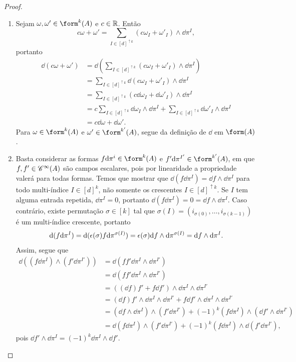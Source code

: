 \begin{proof}
	\begin{enumerate}
	\item Sejam $\omega,\omega' \in \form^k (A)$ e $c \in \mathbb{R}$. Então
	\begin{equation*}
	c\omega + \omega' = \sum_{I \in [d]^{\uparrow k}} (c\omega_I + \omega'_I) \wedge \dd\pi^I,
	\end{equation*}	
portanto
		\begin{align*}
		\dd (c\omega + \omega') &= \dd \left( \sum_{I \in [d]^{\uparrow k}} (c\omega_I + \omega'_I) \wedge \dd\pi^I \right) \\
			&= \sum_{I \in [d]^{\uparrow k}} \dd(c\omega_I + \omega'_I) \wedge \dd\pi^I \\
			&= \sum_{I \in [d]^{\uparrow k}} (c\dd\omega_I + \dd\omega'_I) \wedge \dd\pi^I \\
			&= c\sum_{I \in [d]^{\uparrow k}} \dd\omega_I \wedge \dd\pi^I + \sum_{I \in [d]^{\uparrow k}} \dd\omega'_I \wedge \dd\pi^I \\
			&= c\dd\omega + \dd\omega'.
		\end{align*}
Para $\omega \in \form^k (A)$ e $\omega' \in \form^{k'} (A)$, segue da definição de $\dd$ em $\form (A)$.
	
	\item Basta considerar as formas $f \dd\pi^i \in \form^k (A)$ e $f' \dd\pi^{I'} \in \form^{k'} (A)$, em que $f,f' \in \mathscr{C}^\infty(A)$ são campos escalares, pois por linearidade a propriedade valerá para todas formas. Temos que mostrar que $\dd(f \dd\pi^I)=\dd f \wedge \dd\pi^I$ para todo multi-índice $I \in [d]^k$, não somente os crescentes $I \in [d]^{\uparrow k}$. Se $I$ tem alguma entrada repetida, $\dd\pi^I = 0$, portanto $\dd(f \dd\pi^I) = 0 = \dd f \wedge \dd\pi^I$. Caso contrário, existe permutação $\sigma \in [k]$ tal que $\sigma(I) = (i_{\sigma(0)},\ldots,i_{\sigma(k-1)})$ é um multi-índice crescente, portanto
		\begin{equation*}
		\mathrm{d}(f \mathrm{d}\pi^I) = \mathrm{d}(\epsilon(\sigma)f \mathrm{d}\pi^{\sigma(I)}) = \epsilon(\sigma) \mathrm{d} f \wedge \mathrm{d}\pi^{\sigma(I)} = \mathrm{d} f \wedge \mathrm{d}\pi^I.
		\end{equation*}
Assim, segue que
	\begin{align*}
	\dd((f \dd\pi^I) \wedge (f' \dd\pi^{I'})) &= \dd(ff' \dd\pi^I \wedge \dd\pi^{I'}) \\
		&= \dd(ff' \dd\pi^I \wedge \dd\pi^{I'}) \\
		&= ((\dd f) f' + f \dd f') \wedge \dd\pi^I \wedge \dd\pi^{I'} \\
		&= (\dd f)f' \wedge \dd\pi^I \wedge \dd\pi^{I'} + f \dd f' \wedge \dd\pi^I \wedge \dd\pi^{I'} \\
		&= (\dd f \wedge \dd\pi^I) \wedge (f' \dd\pi^{I'}) + (-1)^k (f \dd\pi^I) \wedge (\dd f' \wedge \dd\pi^{I'}) \\
		&= \dd (f \dd\pi^I) \wedge (f' \dd\pi^{I'}) + (-1)^k (f \dd\pi^I) \wedge \dd (f' \dd\pi^{I'}),
	\end{align*}
pois $\dd f' \wedge \dd\pi^I = (-1)^k \dd\pi^I \wedge \dd f'$.
	

\end{enumerate}
\end{proof}
